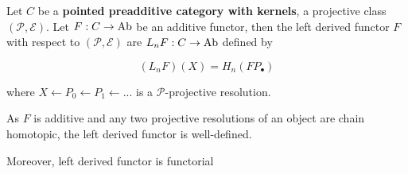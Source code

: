 \documentclass{article}
\begin{document}

\begin{comment}
\begin{definition}[right exact functor]
    Let $C, D$ be \textbf{pointed preadditive categories with kernels}, a projective class $(\mathcal{P}, \mathcal{E})$ and a short exact sequence
    $$
        0 \to A \to B \to C \to 0
    $$

    A functor $F: C \to D$ is called left exact if
    $$
        0 \to F(A) \to F(B) \to F(C)
    $$

    is exact
    
\end{definition}

\note{TODO - on the behavior of functor on zero object}

\begin{remark}
    In an \textbf{abelian category}, every left exact functor is additive.
\end{remark}
\end{comment}

\begin{definition}
    Let $C$ be a \textbf{pointed preadditive category with kernels}, a projective class $(\mathcal{P}, \mathcal{E})$. Let $F: C \to \operatorname{Ab}$ be an additive functor, then the left derived functor $F$ with respect to $(\mathcal{P}, \mathcal{E})$ are $L_n F: C \to \operatorname{Ab}$ defined by

    $$
        (L_n F) (X) = H_n(F P_\bullet)
    $$

    where $X \leftarrow P_0 \leftarrow P_1 \leftarrow ...$ is a $\mathcal{P}$-projective resolution.
\end{definition}

\begin{remark}
    As $F$ is additive and any two projective resolutions of an object are chain homotopic, the left derived functor is well-defined.

    Moreover, left derived functor is functorial 
\end{remark}

\begin{remark}
\end{remark}
\end{document}
